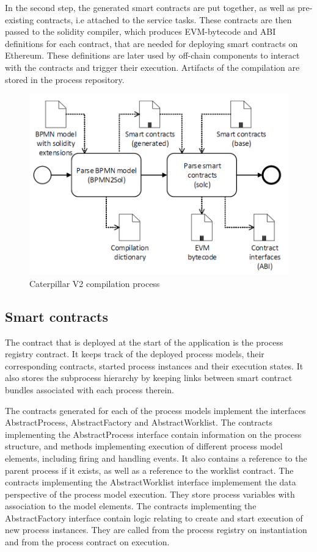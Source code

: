 In the second step, the generated smart contracts are put together, as well as pre-existing contracts, i.e attached to the service tasks. These contracts are then passed to the solidity compiler, which produces EVM-bytecode and ABI definitions for each contract, that are needed for deploying smart contracts on Ethereum. These definitions are later used by off-chain components to interact with the contracts and trigger their execution. Artifacts of the compilation are stored in the process repository.

\begin{figure}[hbt]
	\includegraphics[width=\textwidth]{gfx/caterpillar-compilation-process}
	\caption{Caterpillar V2 compilation process}
	\label{fig:caterpillar:v2:compilation}
\end{figure}

\subsection{Smart contracts}
The contract that is deployed at the start of the application is the process registry contract. It keeps track of the deployed process models, their corresponding contracts, started process instances and their execution states. It also stores the subprocess hierarchy by keeping links between smart contract bundles associated with each process therein.

The contracts generated for each of the process models implement the interfaces AbstractProcess, AbstractFactory and AbstractWorklist. The contracts implementing the AbstractProcess interface contain information on the process structure, and methods implementing execution of different process model elements, including firing and handling events. It also contains a reference to the parent process if it exists, as well as a reference to the worklist contract. The contracts implementing the AbstractWorklist interface implemement the data perspective of the process model execution. They store process variables with association to the model elements.
The contracts implementing the AbstractFactory interface contain logic relating to create and start execution of new process instances. They are called from the process registry on instantiation and from the process contract on execution.

